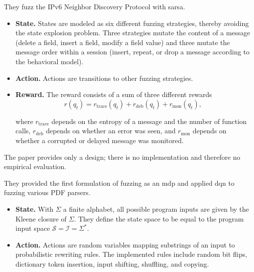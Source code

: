 \begin{description}[style=nextline, leftmargin=0pt, labelindent=0pt, labelwidth=0pt]
  \item[Becker et al.\ (2010)~\cite{hutchison_autonomic_2010}]
    They fuzz the IPv6 Neighbor Discovery Protocol with \gls{sarsa}.

    \begin{itemize}
      \item \textbf{State.}
        States are modeled as six different fuzzing strategies, thereby
        avoiding the state explosion problem.
        Three strategies mutate the content of a message (delete a field, insert a
        field, modify a field value) and three mutate the message order within a
        session (insert, repeat, or drop a message according to the behavioral
        model).

      \item \textbf{Action.}
        Actions are transitions to other fuzzing strategies.

      \item \textbf{Reward.}
        The reward consists of a sum of three different rewards
        \[
          r(q_t) = r_{\text{trace}}(q_t) + r_{\text{deb}}(q_t) + r_{\text{mon}}(q_t),
        \]

        where $r_{\text{trace}}$ depends on the entropy of a message and the
        number of function calls, $r_{\text{deb}}$ depends on whether
        an error was seen, and $r_{\text{mon}}$ depends on whether a corrupted
        or delayed message was monitored.
    \end{itemize}
    The paper provides only a design; there is no implementation and therefore
    no empirical evaluation.

  \item[Böttinger et al.\ (2018)~\cite{bottinger_deep_2018}]
    They provided the first formulation of fuzzing as an \gls{mdp} and applied \gls{dqn}
    to fuzzing various PDF parsers.

    \begin{itemize}
      \item \textbf{State.}
        With $\Sigma$ a finite alphabet, all possible program inputs are given
        by the Kleene closure of $\Sigma$.
        They define the state space to be equal to the program input space $\mathcal{S}=\mathcal{I}=\Sigma^*$.

      \item \textbf{Action.}
        Actions are random variables mapping substrings of an input to probabilistic rewriting rules.
        The implemented rules include random bit flips, dictionary token insertion,
        input shifting, shuffling, and copying.


\end{itemize}
\end{description}
